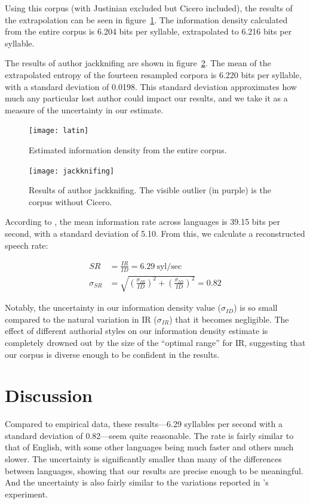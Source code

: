 \documentclass[12pt,twoside]{article}
\begin{document}
Using this corpus (with Justinian excluded but Cicero included), the results of the extrapolation can be seen in figure~\ref{fig:results}. The information density calculated from the entire corpus is 6.204 bits per syllable, extrapolated to 6.216 bits per syllable.

The results of author jackknifing are shown in figure~\ref{fig:jackknifing}. The mean of the extrapolated entropy of the fourteen resampled corpora is 6.220 bits per syllable, with a standard deviation of 0.0198. This standard deviation approximates how much any particular lost author could impact our results, and we take it as a measure of the uncertainty in our estimate.

\begin{figure}[p]
\centering
\caption{Estimated information density from the entire corpus.}
\label{fig:results}
\noindent\texttt{[image: latin]}
\end{figure}

\begin{figure}[p]
\centering
\caption{Results of author jackknifing. The visible outlier (in purple) is the corpus without Cicero.}
\label{fig:jackknifing}
\noindent\texttt{[image: jackknifing]}
\end{figure}

According to \citet{coupé}, the mean information rate across languages is 39.15 bits per second, with a standard deviation of 5.10. From this, we calculate a reconstructed speech rate:

\begin{align}
SR &= \frac{IR}{ID} = 6.29\:\textrm{syl/sec} \\
\sigma_{SR} &= \sqrt{\left(\frac{\sigma_{IR}}{ID}\right)^2 + \left(\frac{\sigma_{ID}}{ID}\right)^2} = 0.82
\end{align}

Notably, the uncertainty in our information density value (\(\sigma_{ID}\)) is so small compared to the natural variation in IR (\(\sigma_{IR}\)) that it becomes negligible. The effect of different authorial styles on our information density estimate is completely drowned out by the size of the ``optimal range'' for IR, suggesting that our corpus is diverse enough to be confident in the results.

\section{Discussion}
\label{sec:disc}

Compared to  empirical data, these results---6.29 syllables per second with a standard deviation of 0.82---seem quite reasonable. The rate is fairly similar to that of English, with some other languages being much faster and others much slower. The uncertainty is significantly smaller than many of the differences between languages, showing that our results are precise enough to be meaningful. And the uncertainty is also fairly similar to the variations reported in \citeauthor{coupé}'s experiment.
\end{document}
